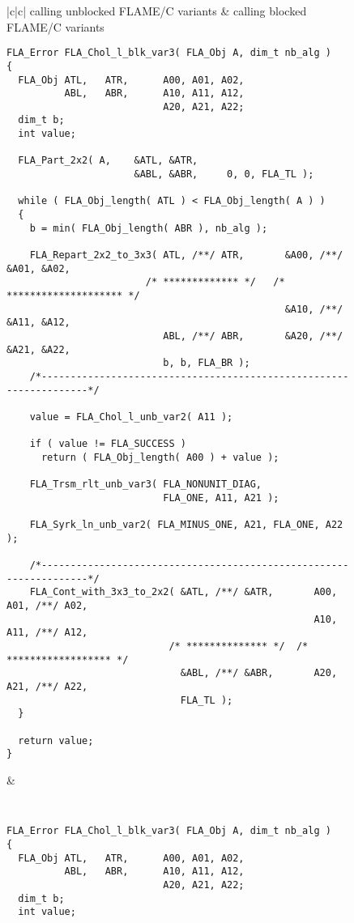 \begin{figure}[tbp]
\begin{center}
\begin{tabular}{|c|c|}
\hline
calling unblocked FLAME/C variants & calling blocked FLAME/C variants \\ \hline
\begin{minipage}[t]{3in}
{\tiny
\begin{verbatim}
FLA_Error FLA_Chol_l_blk_var3( FLA_Obj A, dim_t nb_alg )
{
  FLA_Obj ATL,   ATR,      A00, A01, A02,
          ABL,   ABR,      A10, A11, A12,
                           A20, A21, A22;
  dim_t b;
  int value;

  FLA_Part_2x2( A,    &ATL, &ATR,
                      &ABL, &ABR,     0, 0, FLA_TL );

  while ( FLA_Obj_length( ATL ) < FLA_Obj_length( A ) )
  {
    b = min( FLA_Obj_length( ABR ), nb_alg );

    FLA_Repart_2x2_to_3x3( ATL, /**/ ATR,       &A00, /**/ &A01, &A02,
                        /* ************* */   /* ******************** */
                                                &A10, /**/ &A11, &A12,
                           ABL, /**/ ABR,       &A20, /**/ &A21, &A22,
                           b, b, FLA_BR );
    /*-------------------------------------------------------------------*/

    value = FLA_Chol_l_unb_var2( A11 );

    if ( value != FLA_SUCCESS )
      return ( FLA_Obj_length( A00 ) + value );

    FLA_Trsm_rlt_unb_var3( FLA_NONUNIT_DIAG,
                           FLA_ONE, A11, A21 );

    FLA_Syrk_ln_unb_var2( FLA_MINUS_ONE, A21, FLA_ONE, A22 );

    /*-------------------------------------------------------------------*/
    FLA_Cont_with_3x3_to_2x2( &ATL, /**/ &ATR,       A00, A01, /**/ A02,
                                                     A10, A11, /**/ A12,
                            /* ************** */  /* ****************** */
                              &ABL, /**/ &ABR,       A20, A21, /**/ A22,
                              FLA_TL );
  }

  return value;
}
\end{verbatim}
}
\end{minipage}
&
\begin{minipage}[t]{3in}
{\tt \tiny
\begin{verbatim}
FLA_Error FLA_Chol_l_blk_var3( FLA_Obj A, dim_t nb_alg )
{
  FLA_Obj ATL,   ATR,      A00, A01, A02,
          ABL,   ABR,      A10, A11, A12,
                           A20, A21, A22;
  dim_t b;
  int value;


\end{verbatim}}
\end{minipage}
\end{tabular}
\end{center}
\end{figure}

